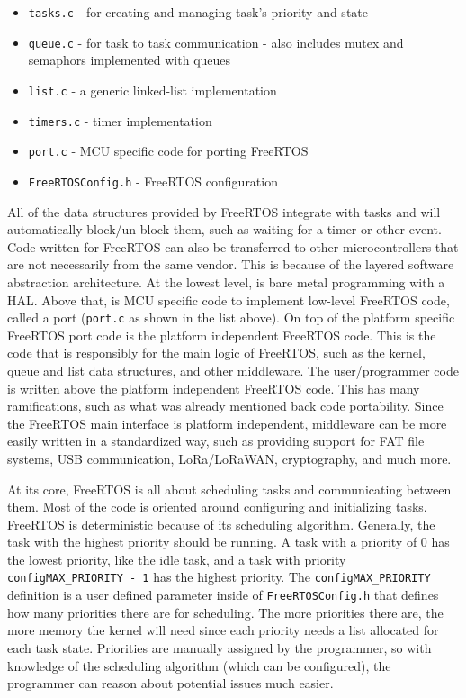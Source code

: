 \begin{itemize}
	\item \texttt{tasks.c} - for creating and managing task's priority and state
	\item \texttt{queue.c} - for task to task communication - also includes mutex and
		semaphors implemented with queues
	\item \texttt{list.c} - a generic linked-list implementation
	\item \texttt{timers.c} - timer implementation
	\item \texttt{port.c} - MCU specific code for porting FreeRTOS
	\item \texttt{FreeRTOSConfig.h} - FreeRTOS configuration
\end{itemize}

All of the data structures provided by FreeRTOS integrate with tasks and will
automatically block/un-block them, such as waiting for a timer or other event.
Code written for FreeRTOS can also be transferred to other microcontrollers that
are not necessarily from the same vendor. This is because of the layered
software abstraction architecture. At the lowest level, is bare metal
programming with a HAL. Above that, is MCU specific code to implement low-level
FreeRTOS code, called a port (\texttt{port.c} as shown in the list above). On top
of the platform specific FreeRTOS port code is the platform independent FreeRTOS
code. This is the code that is responsibly for the main logic of FreeRTOS, such
as the kernel, queue and list data structures, and other middleware. The
user/programmer code is written above the platform independent FreeRTOS code.
This has many ramifications, such as what was already mentioned back code
portability. Since the FreeRTOS main interface is platform independent,
middleware can be more easily written in a standardized way, such as providing
support for FAT file systems, USB communication, LoRa/LoRaWAN, cryptography, and
much more.

At its core, FreeRTOS is all about scheduling tasks and communicating between
them. Most of the code is oriented around configuring and initializing tasks.
FreeRTOS is deterministic because of its scheduling algorithm. Generally, the
task with the highest priority should be running. A task with a priority of 0
has the lowest priority, like the idle task, and a task with priority
\texttt{configMAX\_PRIORITY - 1} has the highest priority. The
\texttt{configMAX\_PRIORITY} definition is a user defined parameter inside of
\texttt{FreeRTOSConfig.h} that defines how many priorities there are for scheduling. The
more priorities there are, the more memory the kernel will need since each
priority needs a list allocated for each task state. Priorities are manually
assigned by the programmer, so with knowledge of the scheduling algorithm (which
can be configured), the programmer can reason about potential issues much
easier.

